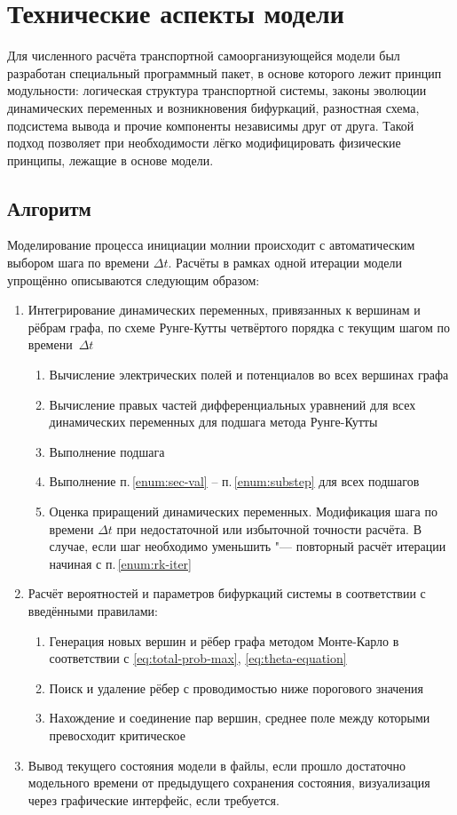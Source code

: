 \section{Технические аспекты модели}
\label{sec:model-tech}
Для численного расчёта транспортной самоорганизующейся модели был разработан специальный программный пакет, в основе которого лежит принцип модульности: логическая структура транспортной системы, законы эволюции динамических переменных и возникновения бифуркаций, разностная схема, подсистема вывода и прочие компоненты независимы друг от друга. Такой подход позволяет при необходимости лёгко модифицировать физические принципы, лежащие в основе модели.

\subsection{Алгоритм}
Моделирование процесса инициации молнии происходит с автоматическим выбором шага по времени $\Delta t$. Расчёты в рамках одной итерации модели упрощённо описываются следующим образом:
\begin{enumerate}
	\item Интегрирование динамических переменных, привязанных к вершинам и рёбрам графа, по схеме Рунге-Кутты четвёртого порядка с текущим шагом по времени~$\Delta t$ \label{enum:rk-iter}
	\begin{enumerate}
		\item Вычисление электрических полей и потенциалов во всех вершинах графа \label{enum:sec-val}
		\item Вычисление правых частей дифференциальных уравнений для всех динамических переменных для подшага метода Рунге-Кутты
		\item Выполнение подшага \label{enum:substep}
		\item Выполнение п.\,\ref{enum:sec-val} -- п.\,\ref{enum:substep} для всех подшагов
		\item Оценка приращений динамических переменных. Модификация шага по времени $\Delta t$ при недостаточной или избыточной точности расчёта. В случае, если шаг необходимо уменьшить "--- повторный расчёт итерации начиная с п.\,\ref{enum:rk-iter}
	\end{enumerate}
	\item Расчёт вероятностей и параметров бифуркаций системы в соответствии с введёнными правилами:
	\begin{enumerate}
		\item Генерация новых вершин и рёбер графа методом Монте-Карло в соответствии с \eqref{eq:total-prob-max}, \eqref{eq:theta-equation}
		\item Поиск и удаление рёбер с проводимостью ниже порогового значения
		\item Нахождение и соединение пар вершин, среднее поле между которыми превосходит критическое
	\end{enumerate}
	\item Вывод текущего состояния модели в файлы, если прошло достаточно модельного времени от предыдущего сохранения состояния, визуализация через графические интерфейс, если требуется.
\end{enumerate}


